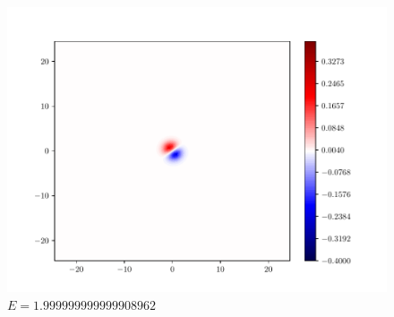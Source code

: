 \documentclass{article}
\begin{document}
\begin{enumerate}[1.]
\begin{enumerate}[(A)]
\begin{enumerate}[(i)]
\begin{figure}[H]
\begin{minipage}{0.3\linewidth}
          \includegraphics[width=\linewidth]{functions-2.pdf}
          \caption*{$E = 1.999999999999908962$}
        \end{minipage}


\end{figure}
\end{enumerate}
\end{enumerate}
\end{enumerate}
\end{document}
